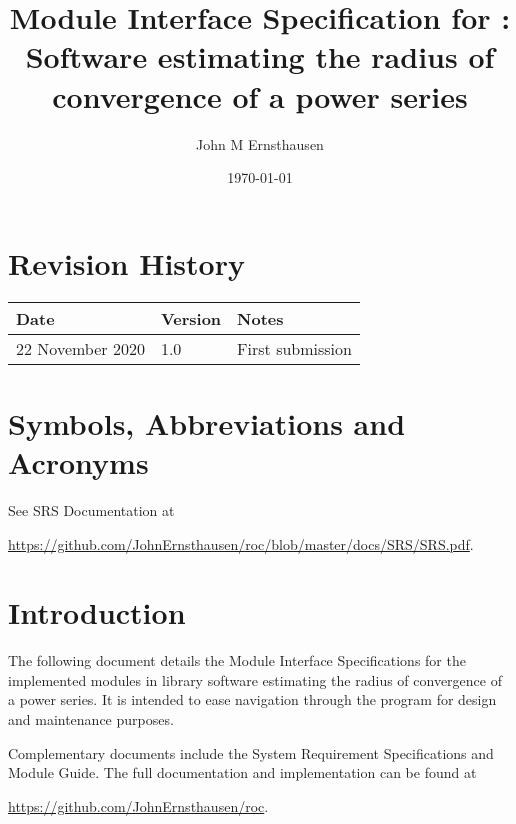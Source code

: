 \documentclass[12pt, titlepage]{article}
\begin{document}
\title{Module Interface Specification for : Software estimating the radius of convergence of
a power series}
\author{John M Ernsthausen}
\date{\today}

\maketitle


\section{Revision History}

\begin{tabularx}{\textwidth}{p{3.5cm}p{2cm}X}
\toprule {\bf Date} & {\bf Version} & {\bf Notes}\\
\midrule
  22 November 2020 & 1.0 & First submission\\
\bottomrule
\end{tabularx}

\newpage

\section{Symbols, Abbreviations and Acronyms}

See SRS Documentation at

\noindent \url{https://github.com/JohnErnsthausen/roc/blob/master/docs/SRS/SRS.pdf}.

\newpage

\tableofcontents

\newpage


\section{Introduction}

The following document details the Module Interface Specifications for the implemented
modules in library software  estimating the radius of convergence of a power series.
It is intended to ease navigation through the program for design and maintenance purposes.

Complementary documents include the System Requirement Specifications and Module Guide.
The full documentation and implementation can be found at

\noindent \url{https://github.com/JohnErnsthausen/roc}.
\end{document}
